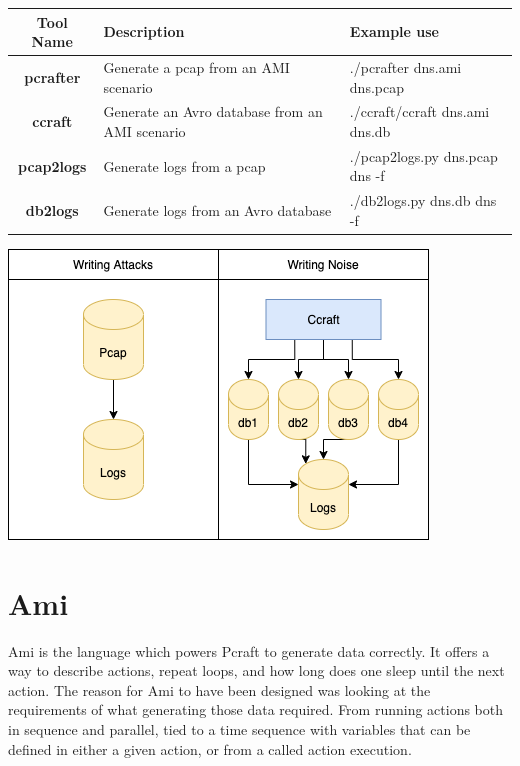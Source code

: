 \documentclass[10pt]{article}
\begin{document}
  \hspace*{-1cm}\begin{tabular}{|c|l|l|}
    \hline
    \textbf{Tool Name} & \textbf{Description} & \textbf{Example use} \\
    \hline
    \textbf{pcrafter} & Generate a pcap from an AMI scenario & ./pcrafter dns.ami dns.pcap \\
    \hline
    \textbf{ccraft} & Generate an Avro database from an AMI scenario & ./ccraft/ccraft dns.ami dns.db \\
    \hline
    \textbf{pcap2logs} & Generate logs from a pcap & ./pcap2logs.py dns.pcap dns -f \\
    \hline
    \textbf{db2logs} & Generate logs from an Avro database & ./db2logs.py dns.db dns -f \\
    \hline
  \end{tabular}

\begin{center}
\includegraphics[width=\textwidth]{noise.png}
\end{center}

\section{Ami}

Ami is the language which powers Pcraft to generate data correctly. It offers a way to describe actions, repeat loops, and how long does one sleep until the next action. The reason for Ami to have been designed was looking at the requirements of what generating those data required. From running actions both in sequence and parallel, tied to a time sequence with variables that can be defined in either a given action, or from a called action execution.
\end{document}
